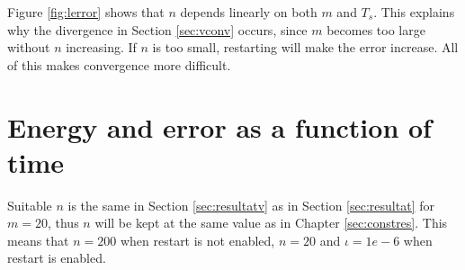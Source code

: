 Figure \ref{fig:lerror} shows that $n$ depends linearly on both $m$ and $T_s$. This explains why the divergence in Section \ref{sec:vconv} occurs, since $m$ becomes too large without $n$ increasing. If $n$ is too small, restarting will make the error increase. All of this makes convergence more difficult.

\section{Energy and error as a function of time } %
Suitable $n$ is the same in Section \ref{sec:resultatv} as in Section \ref{sec:resultat} for $m = 20$, thus $n$ will be kept at the same value as in Chapter \ref{sec:constres}. This means that $n = 200$ when restart is not enabled, $n = 20$ and $\iota = 1e-6$ when restart is enabled.
